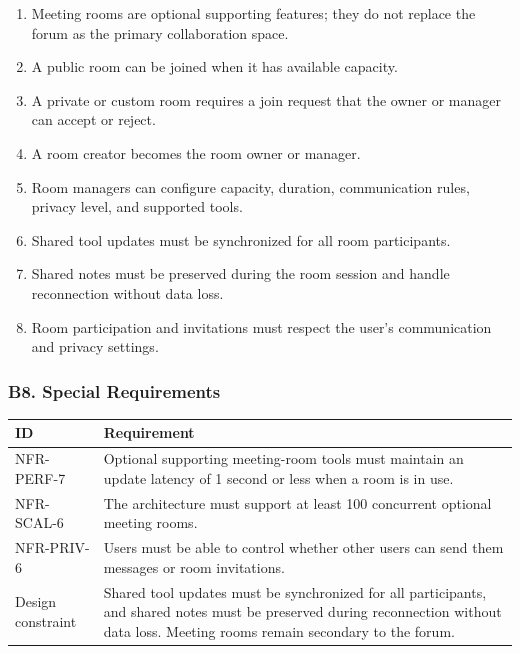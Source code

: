 \documentclass[12pt]{article}
\renewcommand{\baselinestretch}{1.5}
\begin{document}
\begin{enumerate}
\item Meeting rooms are optional supporting features; they do not replace the forum as the primary collaboration space.
\item A public room can be joined when it has available capacity.
\item A private or custom room requires a join request that the owner or manager can accept or reject.
\item A room creator becomes the room owner or manager.
\item Room managers can configure capacity, duration, communication rules, privacy level, and supported tools.
\item Shared tool updates must be synchronized for all room participants.
\item Shared notes must be preserved during the room session and handle reconnection without data loss.
\item Room participation and invitations must respect the user's communication and privacy settings.
\end{enumerate}
\par\medskip

\hypertarget{sec:b8-special-requirements}{}
\subsubsection*{B8. Special Requirements}
\par\medskip

\begingroup
\small
\renewcommand{\baselinestretch}{1.0}\selectfont
\renewcommand{\arraystretch}{1.15}
\setlength{\tabcolsep}{6pt}
\begin{longtable}{|>{\raggedright\arraybackslash}p{}|>{\raggedright\arraybackslash}p{}|}
\hline
\textbf{ID} & \textbf{Requirement} \\ \hline
\endhead
NFR-PERF-7 & Optional supporting meeting-room tools must maintain an update latency of 1 second or less when a room is in use. \\ \hline
NFR-SCAL-6 & The architecture must support at least 100 concurrent optional meeting rooms. \\ \hline
NFR-PRIV-6 & Users must be able to control whether other users can send them messages or room invitations. \\ \hline
Design constraint & Shared tool updates must be synchronized for all participants, and shared notes must be preserved during reconnection without data loss. Meeting rooms remain secondary to the forum. \\ \hline
\end{longtable}
\endgroup
\par\medskip
\end{document}
